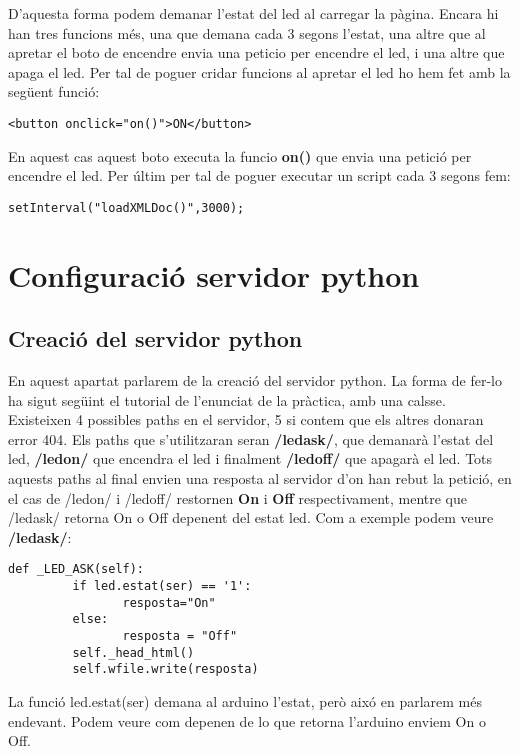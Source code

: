 \documentclass[11p]{article}
\begin{document}
\newline
D'aquesta forma podem demanar l'estat del led al carregar la pàgina. Encara hi han tres funcions més, una que demana cada 3 segons l'estat, una altre que al apretar el boto de encendre envia una peticio per encendre el led, i una altre que apaga el led.
\newline
Per tal de poguer cridar funcions al apretar el led ho hem fet amb la següent funció:
\newline
\begin{lstlisting}
<button onclick="on()">ON</button>
\end{lstlisting}
En aquest cas aquest boto executa la funcio \textbf{on()} que envia una petició per encendre el led. Per últim per tal de poguer executar un script cada 3 segons fem:
\newline
\begin{lstlisting}
setInterval("loadXMLDoc()",3000);
\end{lstlisting}

\section{Configuració servidor python}
\subsection{Creació del servidor python}
En aquest apartat parlarem de la creació del servidor python. La forma de fer-lo ha sigut següint el tutorial de l'enunciat de la pràctica, amb una calsse.
\newline
Existeixen 4 possibles paths en el servidor, 5 si contem que els altres donaran error 404. Els paths que s'utilitzaran seran \textbf{/led\textunderscore ask/}, que demanarà l'estat del led, \textbf{/led\textunderscore on/} que encendra el led i finalment \textbf{/led\textunderscore off/} que apagarà el led. Tots aquests paths al final envien una resposta al servidor d'on han rebut la petició, en el cas de /led\textunderscore on/ i /led\textunderscore off/ restornen \textbf{On} i \textbf{Off} respectivament, mentre que /led\textunderscore ask/ retorna On o Off depenent del estat led. Com a exemple podem veure \textbf{/led\textunderscore ask/}:
\newline
\begin{lstlisting}
def _LED_ASK(self):
         if led.estat(ser) == '1':
                resposta="On"
         else:
                resposta = "Off"
         self._head_html()
         self.wfile.write(resposta)
\end{lstlisting}
La funció led.estat(ser) demana al arduino l'estat, però aixó en parlarem més endevant. Podem veure com depenen de lo que retorna l'arduino enviem On o Off.
\end{document}
